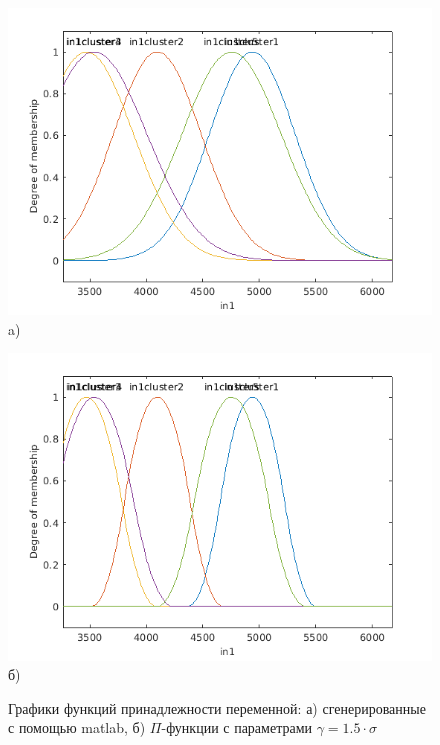 \begin{figure}[H]
	\begin{minipage}[h]{0.49\linewidth}
		\centering
		\includegraphics[width=1\linewidth]{img/gauss}
		a)\\
	\end{minipage}
	\hfill
	\begin{minipage}[h]{0.49\linewidth}
		\centering
		\includegraphics[width=1\linewidth]{img/1_5sigma}
		б)\\
	\end{minipage}
	\caption{Графики функций принадлежности переменной: а) сгенерированные с помощью matlab, б) $\Pi$-функции с параметрами $\gamma=1.5\cdot\sigma$}
	\label{fig:a-b}
\end{figure}
